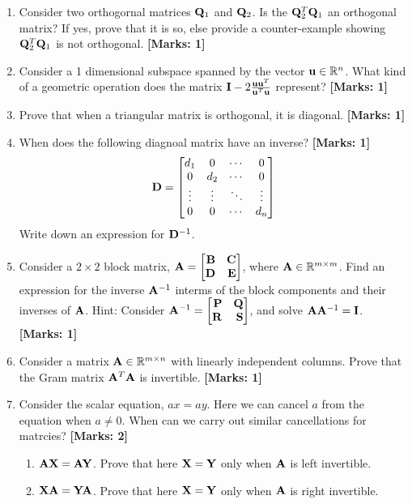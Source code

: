 \documentclass[12pt]{article}
\def\mf{\ensuremath\mathbf}
\def\mb{\ensuremath\mathbb}
\def\bmx{\ensuremath\begin{bmatrix*}[r]}
\def\emx{\ensuremath\end{bmatrix*}}
\begin{document}
\begin{enumerate}
  \item Consider two orthogornal matrices $\mf{Q}_1$ and $\mf{Q}_2$. Is the $\mf{Q}_2^T\mf{Q}_1$ an orthogonal matrix? If yes, prove that it is so, else provide a counter-example showing $\mf{Q}_2^T\mf{Q}_1$ is not orthogonal. \textbf{[Marks: 1]}

  \item Consider a 1 dimensional subspace spanned by the vector $\mf{u} \in \mb{R}^n$. What kind of a geometric operation does the matrix $\mf{I} - 2\frac{\mf{u}\mf{u}^T}{\mf{u}^T\mf{u}}$ represent? \textbf{[Marks: 1]}

  \item Prove that when a triangular matrix is orthogonal, it is diagonal. \textbf{[Marks: 1]}

  \item When does the following diagnoal matrix have an inverse? \textbf{[Marks: 1]}
  \[ \mf{D} = \begin{bmatrix*}
  d_1 & 0 & \cdots & 0\\
  0 & d_2 & \cdots & 0\\
  \vdots & \vdots & \ddots & \vdots\\
  0 & 0 & \cdots & d_n\\\end{bmatrix*} \]
  Write down an expression for $\mf{D}^{-1}$.
  
  \item Consider a $2 \times 2$ block matrix, $\mf{A} = \bmx \mf{B} & \mf{C}\\\mf{D} & \mf{E}\emx$, where $\mf{A} \in \mb{R}^{m \times m}$. Find an expression for the inverse $\mf{A}^{-1}$ interms of the block components and their inverses of $\mf{A}$. Hint: Consider $\mf{A}^{-1} = \bmx \mf{P} & \mf{Q}\\ \mf{R} & \mf{S}\emx$, and solve $\mf{A}\mf{A}^{-1} = \mf{I}$. \textbf{[Marks: 1]}

  \item Consider a matrix $\mf{A} \in \mathbb{R}^{m \times n}$ with linearly independent columns. Prove that the Gram matrix $\mf{A}^T\mf{A}$ is invertible. \textbf{[Marks: 1]}

  \item Consider the scalar equation, $ax = ay$. Here we can cancel $a$ from the equation when $a \neq 0$. When can we carry out similar cancellations for matrcies? \textbf{[Marks: 2]}
  \begin{enumerate}
      \item $\mf{A}\mf{X} = \mf{A}\mf{Y}$. Prove that here $\mf{X}=\mf{Y}$ only when $\mf{A}$ is left invertible.
      \item $\mf{X}\mf{A} = \mf{Y}\mf{A}$. Prove that here $\mf{X}=\mf{Y}$ only when $\mf{A}$ is right invertible.
  \end{enumerate}


\end{enumerate}
\end{document}
